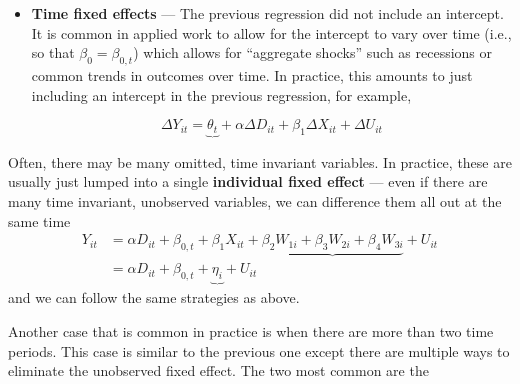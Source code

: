 \documentclass[
  letterpaper,
  DIV=11,
  numbers=noendperiod]{scrreprt}
\begin{document}
\begin{itemize}
\item
  \textbf{Time fixed effects} --- The previous regression did not
  include an intercept. It is common in applied work to allow for the
  intercept to vary over time (i.e., so that \(\beta_0 = \beta_{0,t}\))
  which allows for ``aggregate shocks'' such as recessions or common
  trends in outcomes over time. In practice, this amounts to just
  including an intercept in the previous regression, for example,

  \[
      \Delta Y_{it} = \underbrace{\theta_t} + \alpha \Delta D_{it} + \beta_1 \Delta X_{it} + \Delta U_{it} 
    \]
\end{itemize}

Often, there may be many omitted, time invariant variables. In practice,
these are usually just lumped into a single \textbf{individual fixed
effect} --- even if there are many time invariant, unobserved variables,
we can difference them all out at the same time \begin{align*}
  Y_{it} &= \alpha D_{it} + \beta_{0,t} + \beta_1 X_{it} + \underbrace{\beta_2 W_{1i} + \beta_3 W_{2i} + \beta_4 W_{3i}} + U_{it} \\
  &= \alpha D_{it} + \beta_{0,t} + \underbrace{\eta_i} + U_{it} 
\end{align*} and we can follow the same strategies as above.

Another case that is common in practice is when there are more than two
time periods. This case is similar to the previous one except there are
multiple ways to eliminate the unobserved fixed effect. The two most
common are the
\end{document}
